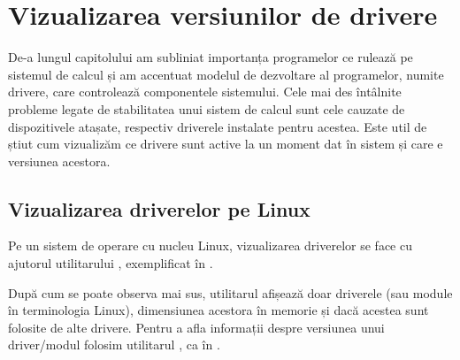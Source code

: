 \section{Vizualizarea versiunilor de drivere}
\label{sec:hw:driver-view}

De-a lungul capitolului am subliniat importanța programelor ce rulează pe
sistemul de calcul și am accentuat modelul de dezvoltare al programelor, numite
drivere, care controlează componentele sistemului. Cele mai des întâlnite
probleme legate de stabilitatea unui sistem de calcul sunt cele cauzate de
dispozitivele atașate, respectiv driverele instalate pentru acestea. Este util
de știut cum vizualizăm ce drivere sunt active la un moment dat în sistem și
care e versiunea acestora.

\subsection{Vizualizarea driverelor pe Linux}
\label{sec:hw:driver-view:linux}

Pe un sistem de operare cu nucleu Linux, vizualizarea driverelor se face cu
ajutorul utilitarului , exemplificat în .


După cum se poate observa mai sus, utilitarul  afișează doar driverele (sau
module în terminologia Linux), dimensiunea acestora în memorie și dacă acestea
sunt folosite de alte drivere. Pentru a afla informații despre versiunea unui
driver/modul folosim utilitarul , ca în .


